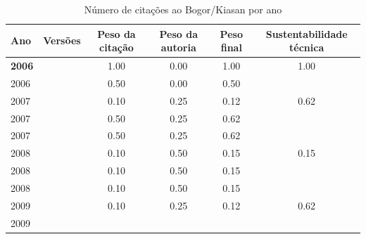 \begin{table}[H]
\caption{Número de citações ao Bogor/Kiasan por ano}
\centering
\begin{tabular}{| l | c | c | c | c | c |}
  \hline
  Ano & Versões & Peso da citação & Peso da autoria & Peso final & Sustentabilidade técnica \\
  \hline
            {\bf 2006}
          &
          
          &
          1.00
          &
          0.00
          &
          1.00
          &
            {\color{blue} 1.00}
          \\
            2006
          &
          
          &
          0.50
          &
          0.00
          &
          0.50
          &
          \\
\hline
            2007
          &
          
          &
          0.10
          &
          0.25
          &
          0.12
          &
            {\color{blue} 0.62}
          \\
            2007
          &
          
          &
          0.50
          &
          0.25
          &
          0.62
          &
          \\
            2007
          &
          
          &
          0.50
          &
          0.25
          &
          0.62
          &
          \\
\hline
            2008
          &
          
          &
          0.10
          &
          0.50
          &
          0.15
          &
            {\color{red} 0.15}
          \\
            2008
          &
          
          &
          0.10
          &
          0.50
          &
          0.15
          &
          \\
            2008
          &
          
          &
          0.10
          &
          0.50
          &
          0.15
          &
          \\
\hline
            2009
          &
          
          &
          0.10
          &
          0.25
          &
          0.12
          &
            {\color{blue} 0.62}
          \\
            2009
          &
          

\end{tabular}
\end{table}
